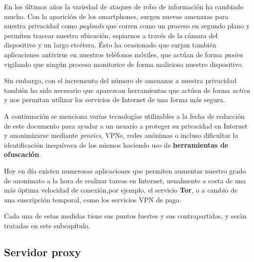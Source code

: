 En los últimos años la variedad de ataques de robo de información ha
cambiado mucho. Con la aparición de los smartphones, surgen nuevas
amenazas para nuestra privacidad como \textit{payloads} que corren
como un proceso en segundo plano y permiten tracear nuestra ubicación,
espiarnos a través de la cámara del dispositivo y un largo
etcétera. Ésto ha ocasionado que surjan también aplicaciones antivirus
en nuestros teléfonos móviles, que actúan de forma \textit{pasiva}
vigilando que ningún proceso monitorice de forma maliciosa nuestro
dispositivo.

Sin embargo, con el incremento del número de amenazas a nuestra
privacidad también ha sido necesario que aparezcan herramientas que
actúen de forma \textit{activa} y nos permitan utilizar los servicios
de Internet de una forma más segura.

	
\label{sec:a_favor}

A continuación se menciona varias tecnologías utilizables a la fecha
de redacción de este documento para ayudar a un usuario a proteger su
privacidad en Internet y anonimizarse mediante \textit{proxies}, VPNs,
redes anónimas o incluso dificultar la identificación inequívoca de
los mismos haciendo uso de \textbf{herramientas de ofuscación}.

Hoy en día existen numerosas aplicaciones que permiten aumentar
nuestro grado de anonimato a la hora de realizar tareas en Internet,
usualmente a costa de una más óptima velocidad de conexión,por
ejemplo, el servicio \textbf{Tor}, o a cambio de una suscripción
temporal, como los servicios VPN de pago.

Cada una de estas medidas tiene sus puntos fuertes y sus
contrapartidas, y serán tratadas en este subcapítulo.
\subsection{Servidor proxy}


